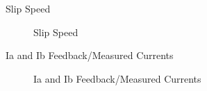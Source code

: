 \begin{frame}{Slip Speed}
	\begin{figure}
		\centering

		\caption{Slip Speed}
	\end{figure}
\end{frame}

\begin{frame}{Ia and Ib Feedback/Measured Currents}
	\begin{figure}
		\centering

		\caption{Ia and Ib Feedback/Measured Currents}
	\end{figure}
\end{frame}

